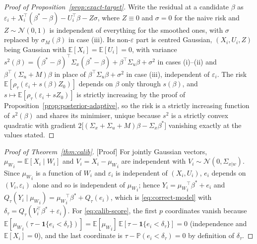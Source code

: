 \documentclass[12pt,a4paper]{article}
\theoremstyle{definition}
\theoremstyle{remark}
\newcommand{\E}{\mathbb{E}}
\newcommand{\Pbb}{\mathbb{P}}
\newcommand{\cN}{\mathcal{N}}
\newcommand{\ind}[1]{\mathbf{1}\{#1\}}
\newcommand{\betas}{\beta^*}
\newcommand{\muv}{\mu_W}
\newcommand{\Sxw}{\Sigma_{x|w}}
\begin{document}
\begin{proof}[Proof of Proposition~\ref{prop:exact-target}]
Write the residual at a candidate $\beta$ as
$\varepsilon_i+X_i^\top(\betas-\beta)-U_i^\top\beta-Z\sigma$, where $Z\equiv0$ and
$\sigma=0$ for the naive risk and $Z\sim\cN(0,1)$ is independent of everything for the
smoothed ones, with $\sigma$ replaced by $\sigma_M(\beta)$ in case (iii). Its
non-$\varepsilon$ part is centred Gaussian, $(X_i,U_i,Z)$ being Gaussian with
$\E[X_i]=\E[U_i]=0$, with variance
$s^2(\beta)=(\betas-\beta)^\top\Sigma_x(\betas-\beta)+\beta^\top\Sigma_u\beta+\sigma^2$ in
cases (i)--(ii) and $\beta^\top(\Sigma_u+M)\beta$ in place of $\beta^\top\Sigma_u\beta+\sigma^2$
in case (iii), independent of $\varepsilon_i$. The risk
$\E[\rho_\tau(\varepsilon_i+s(\beta)Z_0)]$ depends on $\beta$ only through $s(\beta)$, and
$s\mapsto\E[\rho_\tau(\varepsilon_i+sZ_0)]$ is strictly increasing by the proof of
Proposition~\ref{prop:posterior-adaptive}, so the risk is a strictly increasing function of
$s^2(\beta)$ and shares its minimiser, unique because $s^2$ is a strictly convex quadratic
with gradient $2\big[(\Sigma_x+\Sigma_u+M)\beta-\Sigma_x\betas\big]$ vanishing exactly at
the values stated.
\end{proof}

\begin{proof}[Proof of Theorem~\ref{thm:calib}]
[Proof]
For jointly Gaussian vectors, ${\muv}_i=\E[X_i\mid W_i]$ and $V_i = X_i-{\muv}_i$ are
independent with $V_i\sim\cN(0,\Sxw)$. Since ${\muv}_i$ is a function of $W_i$ and
$\varepsilon_i$ is independent of $(X_i,U_i)$, $e_i$ depends on $(V_i,\varepsilon_i)$ alone
and so is independent of ${\muv}_i$; hence $Y_i = {\muv}_i^\top\betas+e_i$ and
$Q_\tau(Y_i\mid{\muv}_i) = {\muv}_i^\top\betas+Q_\tau(e_i)$, which is
\eqref{eq:correct-model} with $\delta_\tau = Q_\tau(V_i^\top\betas+\varepsilon_i)$. For
\eqref{eq:calib-score}, the first $p$ coordinates vanish because
$\E[{\muv}_i(\tau-\ind{e_i<\delta_\tau})] = \E[{\muv}_i]\,\E[\tau-\ind{e_i<\delta_\tau}]=0$
(independence and $\E[X_i]=0$), and the last coordinate is
$\tau-\Pbb(e_i<\delta_\tau)=0$ by definition of $\delta_\tau$.
\end{proof}
\end{document}
